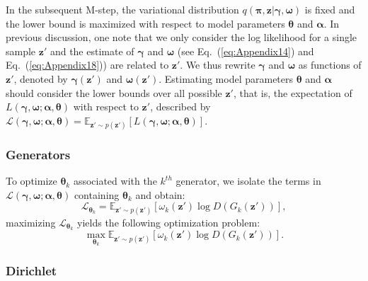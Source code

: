 \documentclass{article}
\begin{document}
In the subsequent M-step, the variational distribution $q\left( \bm{\pi}, \mathbf{z}|\bm{\gamma},\bm{\omega} \right)$ is fixed and the lower bound is maximized with respect to model parameters $\bm{\theta}$ and $\bm{\alpha}$.
In previous discussion, one note that we only consider the log likelihood for a single sample $\mathbf{z}'$ and the estimate of $\bm{\gamma}$ and $\bm{\omega}$ (see Eq.~(\ref{eq:Appendix14}) and Eq.~(\ref{eq:Appendix18})) are related to $\mathbf{z}'$.
We thus rewrite $\bm{\gamma}$ and $\bm{\omega}$ as functions of $\mathbf{z}'$, denoted by $\bm{\gamma}\left(\mathbf{z}'\right)$ and $\bm{\omega}\left(\mathbf{z}'\right)$.
Estimating model parameters $\bm{\theta}$ and $\bm{\alpha}$ should consider the lower bounds over all possible $\mathbf{z}'$, that is, the expectation of $L\left( \bm{\gamma},\bm{\omega}; \bm{\alpha},\bm{\theta} \right)$ with respect to $\mathbf{z}'$, described by $\mathcal{L}\left( \bm{\gamma},\bm{\omega}; \bm{\alpha},\bm{\theta}\right) = \mathbb{E}_{\mathbf{z}'\sim p\left(\mathbf{z}'\right)}\left[L\left( \bm{\gamma},\bm{\omega}; \bm{\alpha},\bm{\theta}\right)\right]$.


\subsubsection{Generators}
\label{App:Generators}

To optimize $\bm{\theta}_k$ associated with the $k^{th}$ generator, we isolate the terms in $\mathcal{L}\left( \bm{\gamma},\bm{\omega}; \bm{\alpha},\bm{\theta}\right)$ containing $\bm{\theta}_k$ and obtain:
\begin{equation}
\label{eq:Appendix19}
\mathcal{L}_{\bm{\theta}_k}
=
\mathbb{E}_{\mathbf{z}' \sim p\left(\mathbf{z}'\right)}
\left[
\omega_k\left( \mathbf{z}' \right)
\log D\left( G_k\left( \mathbf{z}'\right) \right)
\right],
\end{equation}
maximizing $\mathcal{L}_{\bm{\theta}_k}$ yields the following optimization problem:
\begin{equation}
\label{eq:Appendix20}
\max_{\bm{\theta}_k}
\mathbb{E}_{\mathbf{z}' \sim p \left( \mathbf{z}' \right)}
\left[
\omega_k\left( \mathbf{z}' \right)
\log D\left( G_k\left( \mathbf{z}' \right) \right)
\right].
\end{equation}
\subsubsection{Dirichlet}
\label{App:Dirichlet}
\end{document}
